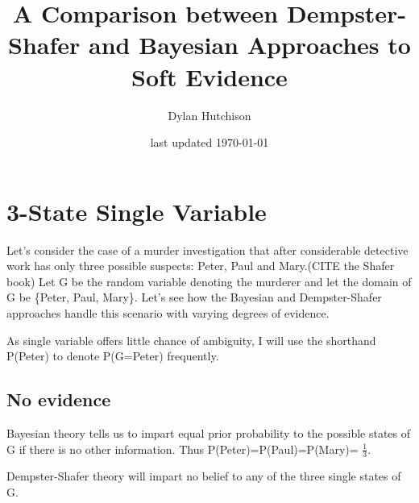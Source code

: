 \documentclass[letterpaper]{article}
\begin{document}
\thispagestyle{empty}
\pagestyle{empty} %

\author{Dylan Hutchison}
\title{A Comparison between Dempster-Shafer and Bayesian Approaches to Soft Evidence}
\date{last updated \today}
\maketitle


\section{3-State Single Variable}
Let's consider the case of a murder investigation that after considerable detective work has only three possible suspects: Peter, Paul and Mary.(CITE the Shafer book)  Let G be the random variable denoting the murderer and let the domain of G be \{Peter, Paul, Mary\}.  Let's see how the Bayesian and Dempster-Shafer approaches handle this scenario with varying degrees of evidence. \cite{Shafer1976}

As single variable offers little chance of ambiguity, I will use the shorthand P(Peter) to denote P(G=Peter) frequently.

\subsection{No evidence}
Bayesian theory tells us to impart equal prior probability to the possible states of G if there is no other information.  Thus P(Peter)=P(Paul)=P(Mary)= $\tfrac{1}{3}$.

Dempster-Shafer theory will impart no belief to any of the three single states of G.



\end{document}
